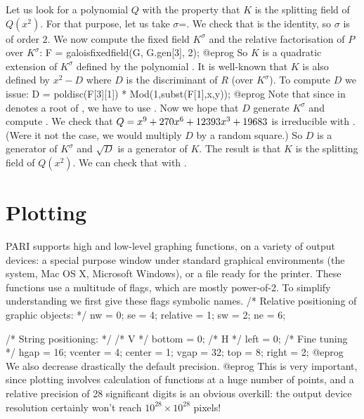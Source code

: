 Let us look for a polynomial $Q$ with the property that $K$ is the splitting
field of $Q(x^2)$. For that purpose, let us take $\sigma$=.  We
check that  is the identity, so $\sigma$ is of order $2$. We now compute the fixed field $K^\sigma$ and the relative factorisation of $P$ over
$K^\sigma$:
\bprog
F = galoisfixedfield(G, G.gen[3], 2);
@eprog\noindent
So $K$ is a quadratic extension of $K^\sigma$ defined by the polynomial
. It is well-known that $K$ is also defined by $x^2-D$
where $D$ is the discriminant of $R$ (over $K^\sigma$).
To compute $D$ we issue:
\bprog
D = poldisc(F[3][1]) * Mod(1,subst(F[1],x,y));
@eprog\noindent
Note that since  in  denotes a root of , we
have to use .  Now we hope that $D$ generate $K^\sigma$ and
compute . We check that $Q=x^9+270\*x^6+12393\*x^3+19683$ is
irreducible with . (Were it not the case, we would
multiply $D$ by a random square.) So $D$ is a generator of $K^\sigma$ and
$\sqrt{D}$ is a generator of $K$. The result is that $K$ is the splitting
field of $Q(x^2)$.  We can check that with
.

\section{Plotting}

PARI supports high and low-level graphing functions, on a variety of output
devices: a special purpose window under standard graphical environments (the
 system, Mac OS X, Microsoft Windows), or a 
file ready for the printer. These functions use a multitude of flags, which
are mostly power-of-2. To simplify understanding we first give these flags
symbolic names.
\bprog
  /* Relative positioning of graphic objects: */
  nw       = 0;  se       = 4;  relative = 1;
  sw       = 2;  ne       = 6;

  /* String positioning: */
  /* V */ bottom  =  0;   /* H */  left   = 0;   /* Fine tuning */ hgap = 16;
          vcenter =  4;            center = 1;                     vgap = 32;
          top     =  8;            right  = 2;
@eprog\noindent
We also decrease drastically the default precision.
\bprog
@eprog\noindent
This is very important, since plotting involves calculation of functions at
a huge number of points, and a relative precision of 28 significant digits
is an obvious overkill: the output device resolution certainly won't reach
$10^{28} \times 10^{28}$ pixels!

